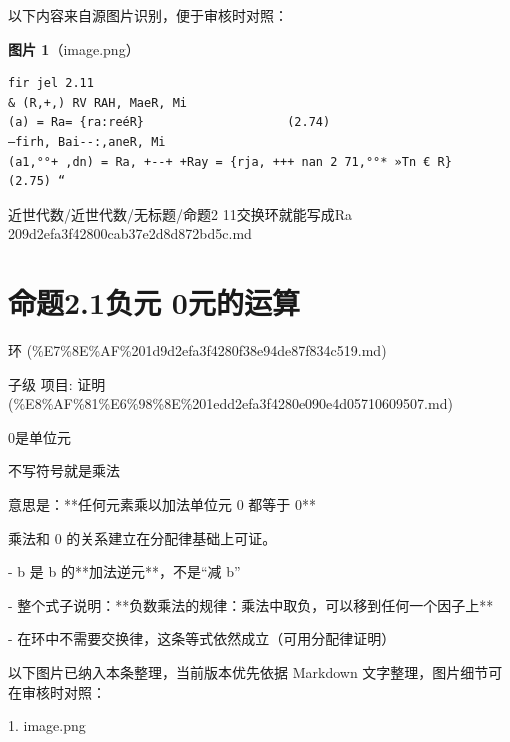\begin{note}
以下内容来自源图片识别，便于审核时对照：

\textbf{图片 1}（image.png）
\begin{Verbatim}[fontsize=\small]
fir jel 2.11
& (R,+,) RV RAH, MaeR, Mi
(a) = Ra= {ra:reéR}                    (2.74)
—firh, Bai--:,aneR, Mi
(a1,°°+ ,dn) = Ra, +--+ +Ray = {rja, +++ nan 2 71,°°* »Tn € R}          (2.75) “
\end{Verbatim}

\end{note}

\begin{note}[来源路径]

近世代数/近世代数/无标题/命题2 11交换环就能写成Ra 209d2efa3f42800cab37e2d8d872bd5c.md

\end{note}

\section*{命题2.1负元 0元的运算}

\begin{note}[来源上级主题]

环 (\%E7\%8E\%AF\%201d9d2efa3f4280f38e94de87f834c519.md)

\end{note}

\begin{proposition}[命题2.1负元 0元的运算]

子级 项目: 证明 (\%E8\%AF\%81\%E6\%98\%8E\%201edd2efa3f4280e090e4d05710609507.md)

0是单位元

不写符号就是乘法

意思是：**任何元素乘以加法单位元 0 都等于 0**

乘法和 0 的关系建立在分配律基础上可证。

- b 是 b 的**加法逆元**，不是“减 b”

- 整个式子说明：**负数乘法的规律：乘法中取负，可以移到任何一个因子上**

- 在环中不需要交换律，这条等式依然成立（可用分配律证明）

\end{proposition}

\begin{note}[关联图片]
以下图片已纳入本条整理，当前版本优先依据 Markdown 文字整理，图片细节可在审核时对照：

1. image.png\\

\end{note}

